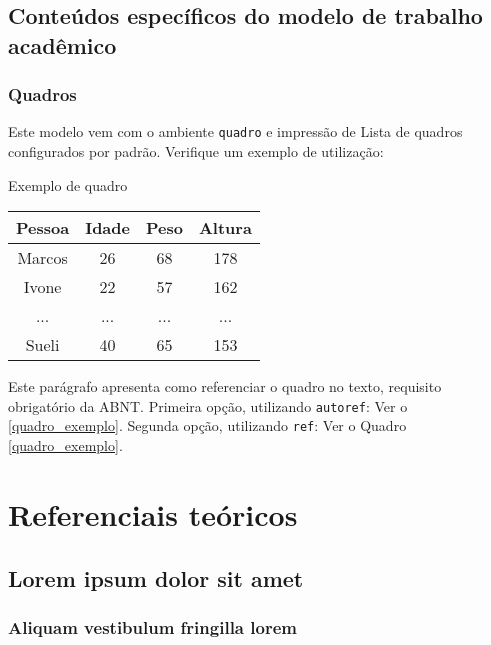 \documentclass[
	12pt,				%
	oneside,
	a4paper,			%
	english,			%
	spanish,			%
	brazil				%
	]{abntex2}
\begin{document}
\chapter{Conteúdos específicos do modelo de trabalho acadêmico}\label{cap_trabalho_academico}

\section{Quadros}

Este modelo vem com o ambiente \texttt{quadro} e impressão de Lista de quadros 
configurados por padrão. Verifique um exemplo de utilização:

\begin{quadro}[htb]
\caption{\label{quadro_exemplo}Exemplo de quadro}
\begin{tabular}{|c|c|c|c|}
	\hline
	\textbf{Pessoa} & \textbf{Idade} & \textbf{Peso} & \textbf{Altura} \\ \hline
	Marcos & 26    & 68   & 178    \\ \hline
	Ivone  & 22    & 57   & 162    \\ \hline
	...    & ...   & ...  & ...    \\ \hline
	Sueli  & 40    & 65   & 153    \\ \hline
\end{tabular}
\end{quadro}

Este parágrafo apresenta como referenciar o quadro no texto, requisito
obrigatório da ABNT. 
Primeira opção, utilizando \texttt{autoref}: Ver o \autoref{quadro_exemplo}. 
Segunda opção, utilizando  \texttt{ref}: Ver o Quadro \ref{quadro_exemplo}.

\part{Referenciais teóricos}

\chapter{Lorem ipsum dolor sit amet}

\section{Aliquam vestibulum fringilla lorem}
\end{document}
